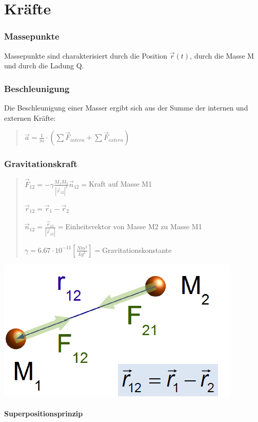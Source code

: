 
\part*{Kräfte}


\section*{Massepunkte}

Massepunkte sind charakterisiert durch die Position $\vec{r}(t)$,
durch die Masse M und durch die Ladung Q.


\section*{Beschleunigung}

Die Beschleunigung einer Masser ergibt sich aus der Summe der internen
und externen Kräfte:
\begin{verse}
$\vec{a}=\frac{1}{m}\cdot(\sum\vec{F}_{intern}+\sum\vec{F}_{extern})$
\end{verse}

\section*{Gravitationskraft}
\begin{verse}
$\vec{F}_{12}=-\gamma\frac{M_{1}M_{2}}{|\vec{r}_{12}|^{2}}\vec{n}_{12}=$Kraft
auf Masse M1

$\vec{r}_{12}=\vec{r}_{1}-\vec{r}_{2}$

$\vec{n}_{12}=\frac{\vec{r}_{12}}{|\vec{r}_{12}|}=$Einheitsvektor
von Masse M2 zu Masse M1

$\gamma=6.67\cdot10^{-11}\left[\frac{Nm^{2}}{kg^{2}}\right]=$Gravitationskonstante
\end{verse}
\includegraphics[scale=0.6]{Kräfte/Gravitation}


\subsection*{Superpositionsprinzip}

